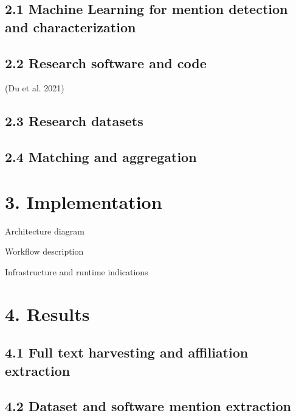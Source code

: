 \documentclass[
]{article}
\begin{document}
\hypertarget{machine-learning-for-mention-detection-and-characterization}{%
\subsection{2.1 Machine Learning for mention detection and
characterization}\label{machine-learning-for-mention-detection-and-characterization}}

\hypertarget{research-software-and-code}{%
\subsection{2.2 Research software and
code}\label{research-software-and-code}}

(Du et al. 2021)

\hypertarget{research-datasets}{%
\subsection{2.3 Research datasets}\label{research-datasets}}

\hypertarget{matching-and-aggregation}{%
\subsection{2.4 Matching and
aggregation}\label{matching-and-aggregation}}

\hypertarget{implementation}{%
\section{3. Implementation}\label{implementation}}

Architecture diagram

Workflow description

Infrastructure and runtime indications

\hypertarget{results}{%
\section{4. Results}\label{results}}

\hypertarget{full-text-harvesting-and-affiliation-extraction}{%
\subsection{4.1 Full text harvesting and affiliation
extraction}\label{full-text-harvesting-and-affiliation-extraction}}

\hypertarget{dataset-and-software-mention-extraction}{%
\subsection{4.2 Dataset and software mention
extraction}\label{dataset-and-software-mention-extraction}}
\end{document}
